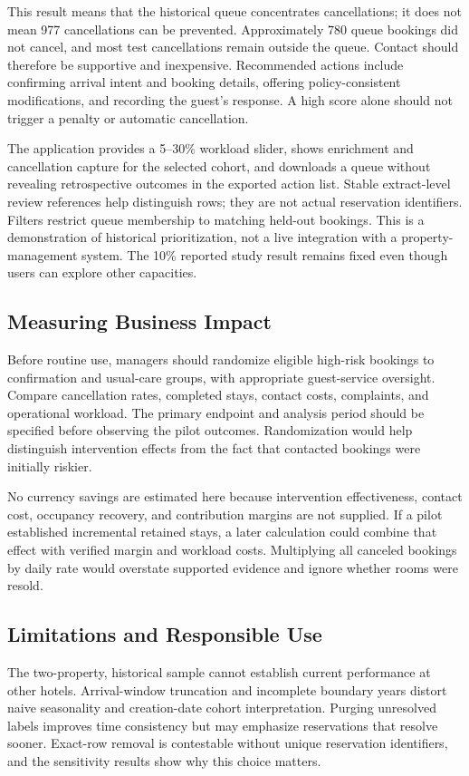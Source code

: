 \documentclass[conference]{IEEEtran}
\begin{document}
This result means that the historical queue concentrates cancellations; it does not mean 977 cancellations can be prevented. Approximately 780 queue bookings did not cancel, and most test cancellations remain outside the queue. Contact should therefore be supportive and inexpensive. Recommended actions include confirming arrival intent and booking details, offering policy-consistent modifications, and recording the guest's response. A high score alone should not trigger a penalty or automatic cancellation.

The application provides a 5--30\% workload slider, shows enrichment and cancellation capture for the selected cohort, and downloads a queue without revealing retrospective outcomes in the exported action list. Stable extract-level review references help distinguish rows; they are not actual reservation identifiers. Filters restrict queue membership to matching held-out bookings. This is a demonstration of historical prioritization, not a live integration with a property-management system. The 10\% reported study result remains fixed even though users can explore other capacities.

\subsection{Measuring Business Impact}
Before routine use, managers should randomize eligible high-risk bookings to confirmation and usual-care groups, with appropriate guest-service oversight. Compare cancellation rates, completed stays, contact costs, complaints, and operational workload. The primary endpoint and analysis period should be specified before observing the pilot outcomes. Randomization would help distinguish intervention effects from the fact that contacted bookings were initially riskier.

No currency savings are estimated here because intervention effectiveness, contact cost, occupancy recovery, and contribution margins are not supplied. If a pilot established incremental retained stays, a later calculation could combine that effect with verified margin and workload costs. Multiplying all canceled bookings by daily rate would overstate supported evidence and ignore whether rooms were resold.

\subsection{Limitations and Responsible Use}
The two-property, historical sample cannot establish current performance at other hotels. Arrival-window truncation and incomplete boundary years distort naive seasonality and creation-date cohort interpretation. Purging unresolved labels improves time consistency but may emphasize reservations that resolve sooner. Exact-row removal is contestable without unique reservation identifiers, and the sensitivity results show why this choice matters.
\end{document}
